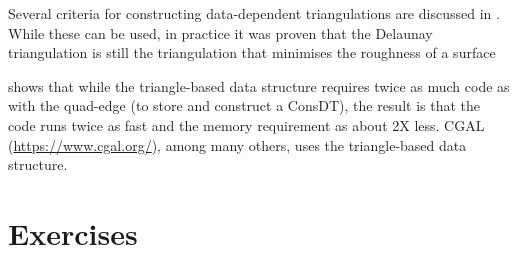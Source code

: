 Several criteria for constructing data-dependent triangulations are discussed in \citet{Dyn90}. 
While these can be used, in practice it was proven that the Delaunay triangulation is still the triangulation that minimises the roughness of a surface~\citep{Wang01,Rippa90}


\citet{Shewchuk97} shows that while the triangle-based data structure requires twice as much code as with the quad-edge (to store and construct a ConsDT), the result is that the code runs twice as fast and the memory requirement as about 2X less.
CGAL (\url{https://www.cgal.org/}), among many others, uses the triangle-based data structure.


%
\section{Exercises}

